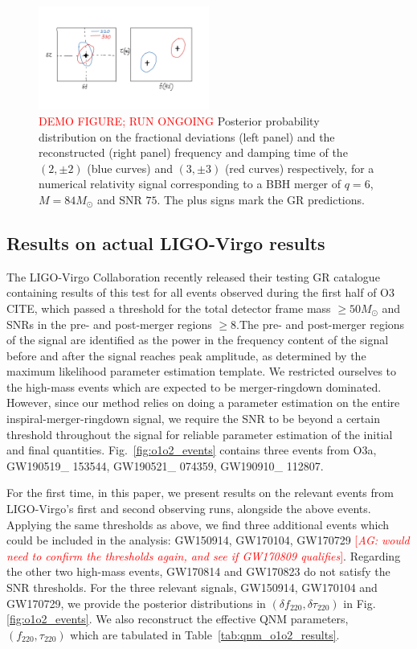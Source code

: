 \documentclass[twocolumn,prd,superscriptaddress,amsfonts,amssymb,amsmath,preprintnumbers]{revtex4-1}
\newcommand{\abhi}[1]{\textcolor{red}{[\textit{AG: #1}]}}
\newcommand{\Mo}{M_{\odot}}
\newcommand{\df}[1]{\delta f_{\text{#1}}}
\newcommand{\dtau}[1]{\delta \tau_{\text{#1}}}
\newcommand{\fngr}[1]{f_{\text{#1}}}
\newcommand{\taungr}[1]{\tau_{\text{#1}}}
\begin{document}
\begin{figure}
	\includegraphics[width=0.5\textwidth]{figures/nohair_sxs_0166_placeholder.png}	
	\caption{\textcolor{red}{DEMO FIGURE; RUN ONGOING} Posterior probability distribution on the fractional deviations (left panel) and the reconstructed (right panel) frequency and damping time of the $(2,\pm 2)$ (blue curves) and $(3,\pm 3)$ (red curves) respectively, for a numerical relativity signal corresponding to a BBH merger of $q=6$,  $M=84 \Mo$ and SNR $75$. The plus signs mark the GR predictions.}
	\label{fig:nohair_sxs}
\end{figure}

\subsection{Results on actual LIGO-Virgo results}

The LIGO-Virgo Collaboration recently released their testing GR catalogue containing results of this test for all events observed during the first half of O3 CITE, which passed a threshold for the total detector frame mass $\geq 50 \Mo$ and SNRs in the pre- and post-merger regions $\geq 8$.The pre- and post-merger regions of the signal are identified as the power in the frequency content of the signal before and after the signal reaches peak amplitude, as determined by the maximum likelihood parameter estimation template. We restricted ourselves to the high-mass events which are expected to be merger-ringdown dominated. However, since our method relies on doing a parameter estimation on the entire inspiral-merger-ringdown signal, we require the SNR to be beyond a certain threshold throughout the signal for reliable parameter estimation of the initial and final quantities. Fig.~\ref{fig:o1o2_events} contains three events from O3a, GW190519\_ 153544, GW190521\_ 074359, GW190910\_ 112807.

For the first time, in this paper, we present results on the relevant events from LIGO-Virgo's first and second observing runs, alongside the above events. Applying the same thresholds as above, we find three additional events which could be included in the analysis: GW150914, GW170104, GW170729 \abhi{would need to confirm the thresholds again, and see if GW170809 qualifies}. Regarding the other two high-mass events, GW170814 and GW170823 do not satisfy the SNR thresholds. For the three relevant signals, GW150914, GW170104 and GW170729, we provide the posterior distributions in $(\df{220}, \dtau{220})$ in Fig.\ref{fig:o1o2_events}. We also reconstruct the effective QNM parameters, $(\fngr{220}, \taungr{220})$ which are tabulated in Table~\ref{tab:qnm_o1o2_results}. 
\end{document}
